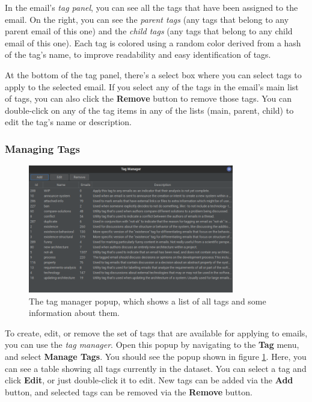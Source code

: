 \documentclass[a4paper, 12pt]{article}
\begin{document}
			In the email's \textit{tag panel}, you can see all the tags that have been assigned to the email. On the right, you can see the \textit{parent tags} (any tags that belong to any parent email of this one) and the \textit{child tags} (any tags that belong to any child email of this one). Each tag is colored using a random color derived from a hash of the tag's name, to improve readability and easy identification of tags.
			
			At the bottom of the tag panel, there's a select box where you can select tags to apply to the selected email. If you select any of the tags in the email's main list of tags, you can also click the \textbf{Remove} button to remove those tags. You can double-click on any of the tag items in any of the lists (main, parent, child) to edit the tag's name or description.
	
		\newpage
		\subsubsection{Managing Tags}
			\begin{figure}[h]
				\centering
				\includegraphics[width=0.8\textwidth]{img/edb-app_tag-manager.png}
				\caption{The tag manager popup, which shows a list of all tags and some information about them.}
				\label{fig:edb-app-tag-manager}
			\end{figure}
			
			To create, edit, or remove the set of tags that are available for applying to emails, you can use the \textit{tag manager}. Open this popup by navigating to the \textbf{Tag} menu, and select \textbf{Manage Tags}. You should see the popup shown in figure \ref{fig:edb-app-tag-manager}. Here, you can see a table showing all tags currently in the dataset. You can select a tag and click \textbf{Edit}, or just double-click it to edit. New tags can be added via the \textbf{Add} button, and selected tags can be removed via the \textbf{Remove} button. 
			
\end{document}
